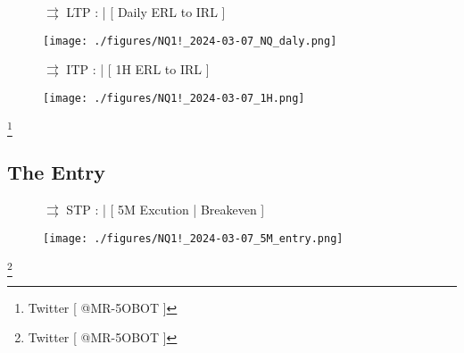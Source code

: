 \documentclass{article}
\begin{document}
\begin{figure}[h]
\begin{notebox}
\noindent \( \rightrightarrows \) \hspace{0.1cm}LTP : | [ Daily ERL to IRL ] 

  \begin{center}
    \texttt{[image: ./figures/NQ1!\_2024-03-07\_NQ\_daly.png]}
  \end{center}
\end{notebox}

\begin{notebox}
   \( \rightrightarrows \) \hspace{0.1cm}ITP : | [ 1H ERL to IRL ]

  \begin{center}
    \texttt{[image: ./figures/NQ1!\_2024-03-07\_1H.png]}
  \end{center}
\end{notebox}
\end{figure}

\footnote{Twitter [ @MR-5OBOT ]}
\newpage

\subsection{The Entry}
\begin{figure}[h]
\begin{notebox}
  \( \rightrightarrows \) \hspace{0.1cm}STP : | [ 5M Excution | Breakeven ]
   \begin{center}
    \texttt{[image: ./figures/NQ1!\_2024-03-07\_5M\_entry.png]}
  \end{center}
\end{notebox}
\end{figure}

\footnote{Twitter [ @MR-5OBOT ]}
\end{document}
